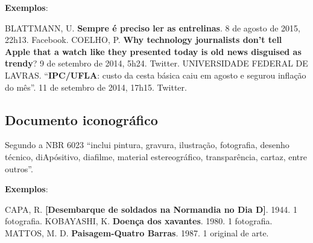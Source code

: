 \begin{exemplomanual}
\textbf{Exemplos}:\\
\begin{singlespace}
BLATTMANN, U. \textbf{Sempre é preciso ler as entrelinas}. 8 de agosto de 2015, 22h13. Facebook.
\newline
\newline
COELHO, P. \textbf{Why technology journalists don't tell Apple that a watch like they presented today is old news disguised as trendy}? 9 de setembro de 2014, 5h24. Twitter.
\newline
\newline
UNIVERSIDADE FEDERAL DE LAVRAS. ``\textbf{IPC/UFLA}: custo da cesta básica caiu em agosto e segurou inflação do mês''. 11 de setembro de 2014, 17h15. Twitter.
\end{singlespace}
\end{exemplomanual}


\subsection{Documento iconográfico}

Segundo a NBR 6023 \cite[p.11]{NBR6023:2002} ``inclui pintura, gravura, ilustração, fotografia, desenho técnico, diApósitivo, diafilme, material estereográfico, transparência, cartaz, entre outros''.

\begin{flushleft}
\begin{singlespace}
\end{singlespace}
\end{flushleft}

\begin{exemplomanual}
\textbf{Exemplos}:\\
\begin{singlespace}
CAPA, R. \textbf{[Desembarque de soldados na Normandia no Dia D]}. 1944. 1 fotografia.
\newline
\newline
KOBAYASHI, K. \textbf{Doença dos xavantes}. 1980. 1 fotografia.
\newline
\newline
MATTOS, M. D. \textbf{Paisagem-Quatro Barras}. 1987. 1 original de arte.
\end{singlespace}
\end{exemplomanual}


